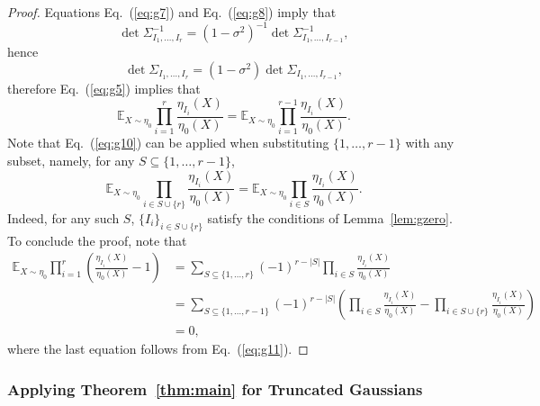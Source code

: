 \documentclass[final, 12pt]{colt2018}
\renewcommand{\eqref}[1]{Eq.~(\ref{#1})}
\begin{document}
\begin{proof}
Equations \eqref{eq:g7} and \eqref{eq:g8} imply that 
\[\det \Sigma_{I_1,\dots, I_r}^{-1} = (1-\sigma^2)^{-1} \det \Sigma_{I_1,\dots,I_{r-1}}^{-1}, \]
hence
\[\det \Sigma_{I_1,\dots, I_r} = (1-\sigma^2) \det \Sigma_{I_1,\dots,I_{r-1}}, \]
therefore \eqref{eq:g5} implies that 
\begin{equation}\label{eq:g10}
\mathbb{E}_{X\sim \eta_0} \prod_{i=1}^{r} \frac{\eta_{I_i}(X)}{\eta_0(X)}
= \mathbb{E}_{X\sim \eta_0} \prod_{i=1}^{r-1} \frac{\eta_{I_i}(X)}{\eta_0(X)}.
\end{equation}
Note that \eqref{eq:g10} can be applied when substituting $\{1,\dots, r-1\}$ with any subset, namely, for any $S \subseteq \{1,\dots,r-1 \}$,
\begin{equation}\label{eq:g11}
\mathbb{E}_{X\sim \eta_0} \prod_{i\in S \cup \{r\}} \frac{\eta_{I_i}(X)}{\eta_0(X)}
= \mathbb{E}_{X\sim \eta_0} \prod_{i\in S} \frac{\eta_{I_i}(X)}{\eta_0(X)}.
\end{equation}
Indeed, for any such $S$, $\{ I_i \}_{i \in S \cup \{r\}}$ satisfy the conditions of Lemma~\ref{lem:gzero}.
To conclude the proof, note that
\begin{align*}
\mathbb{E}_{X\sim \eta_0} \prod_{i=1}^{r} \left( \frac{\eta_{I_i}(X)}{\eta_0(X)}-1 \right)
&= \sum_{S \subseteq \{1,\dots, r\}}(-1)^{r-\lvert S \rvert} \prod_{i \in S} \frac{\eta_{I_i}(X)}{\eta_0(X)}  \\
&= \sum_{S \subseteq \{1,\dots, r-1\}}(-1)^{r-\lvert S \rvert} \left( 
\prod_{i \in S} \frac{\eta_{I_i}(X)}{\eta_0(X)}  - \prod_{i \in S \cup\{r\}} \frac{\eta_{I_i}(X)}{\eta_0(X)} \right) \\
&=0,
\end{align*}
where the last equation follows from \eqref{eq:g11}.
\end{proof}

\subsubsection{Applying Theorem~\ref{thm:main} for Truncated Gaussians} \label{sec:gau-trunc}
\end{document}
